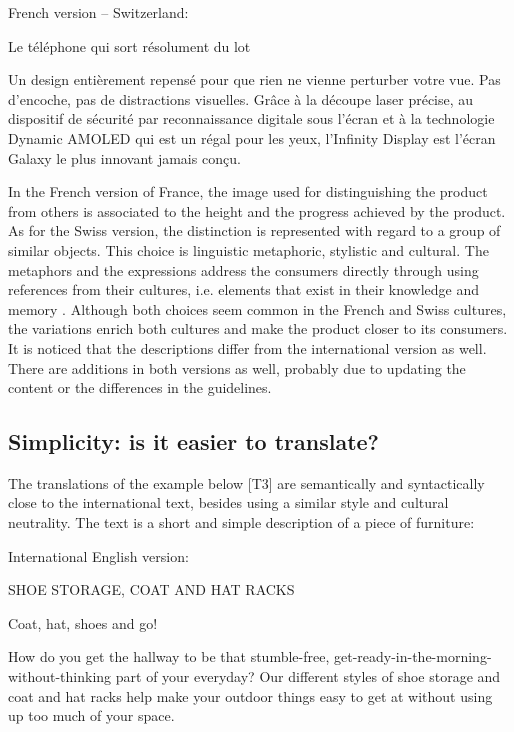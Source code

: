 \documentclass[output=paper]{langsci/langscibook}
\begin{document}
French version – Switzerland:

\begin{center}
  Le téléphone qui sort résolument du lot

  Un design entièrement repensé pour que rien ne vienne perturber votre vue. Pas d'encoche, pas de distractions visuelles. Grâce à la découpe laser précise, au dispositif de sécurité par reconnaissance digitale sous l'écran et à la technologie Dynamic AMOLED qui est un régal pour les yeux, l'Infinity Display est l'écran Galaxy le plus innovant jamais conçu.
\end{center}

In the French version of France, the image used for distinguishing the product from others is associated to the height and the progress achieved by the product. As for the Swiss version, the distinction is represented with regard to a group of similar objects. This choice is linguistic metaphoric, stylistic and cultural. The metaphors and the expressions address the consumers directly through using references from their cultures, i.e. elements that exist in their knowledge and memory \parencite[96]{nord05}. Although both choices seem common in the French and Swiss cultures, the variations enrich both cultures and make the product closer to its consumers. It is noticed that the descriptions differ from the international version as well. There are additions in both versions as well, probably due to updating the content or the differences in the guidelines.

\subsection{Simplicity: is it easier to translate?}

The translations of the example below [T3] are semantically and syntactically close to the international text, besides using a similar style and cultural neutrality. The text is a short and simple description of a piece of furniture: 

International English version:

\begin{center}
  SHOE STORAGE, COAT AND HAT RACKS

  Coat, hat, shoes and go!

  How do you get the hallway to be that stumble-free, get-ready-in-the-morning-without-thinking part of your everyday? Our different styles of shoe storage and coat and hat racks help make your outdoor things easy to get at without using up too much of your space.
\end{center}
\end{document}
